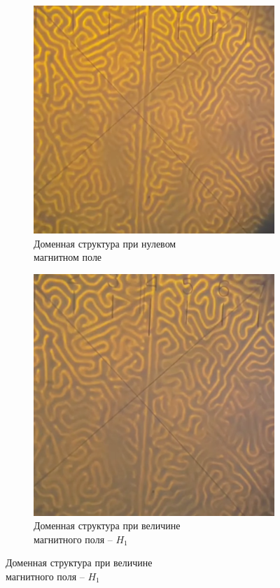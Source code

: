 \documentclass[a4paper,12pt]{article}
\begin{document}
\begin{figure}[h!]
\centering
\begin{subfigure}{.5\textwidth}
  \centering
  \includegraphics[width=0.8\linewidth]{domen_0}
  \caption{Доменная структура при нулевом \\ магнитном поле}
\end{subfigure}%
\begin{subfigure}{.5\textwidth}
  \centering
  \includegraphics[width=0.8\linewidth]{domen_1}
  \caption{Доменная структура  при величине \\ магнитного поля -- $H_1$}
\end{subfigure}
\end{figure}
\end{document}
